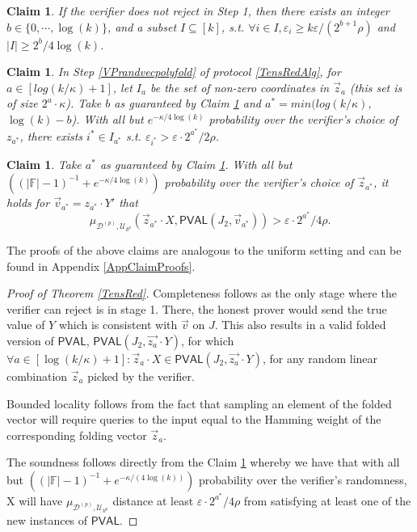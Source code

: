 \documentclass[11pt]{article}
\newtheorem{claim}[theorem]{Claim}
\newcommand{\PVAL}{\mathsf{PVAL}}
\newcommand{\F}{\mathbb{F}}
\begin{document}
\begin{claim}\label{sumEps}
If the verifier does not reject in Step 1, then there exists an integer $b \in \{0,\cdots, \log (k)\}$, and a subset $I \subseteq [k]$, s.t. $\forall i \in I, \varepsilon_{i} \geq k\varepsilon/(2^{b+1}\rho)$ and $\vert I\vert  \geq 2^{b}/4\log (k)$.
\end{claim}

\begin{claim}\label{ISize}
In Step \ref{VPrandvecpolyfold} of protocol \ref{TensRedAlg}, for $a \in [log(k/\kappa) + 1]$, let $I_{a}$ be the set of non-zero coordinates in $\vec{z}_{a}$ (this set is of size $2^{a}\cdot \kappa$). Take $b$ as guaranteed by Claim \ref{sumEps} and $a^{\ast} = min(log(k/\kappa)$, $\log (k) - b$). With all but $e^{-\kappa/4 \log (k)}$ probability over the verifier’s choice of $z_{a^{\ast}}$, there exists $i^{\ast} \in I_{a^{\ast}}$ s.t. $\varepsilon_{i^{\ast}} > \varepsilon \cdot 2^{a^{\ast}}/2\rho$.
\end{claim}

\begin{claim}\label{TensRedSound}
Take $a^{\ast}$ as guaranteed by Claim \ref{ISize}. With all but $((\vert \F\vert -1)^{-1}+e^{-\kappa/4 \log (k)} )$ probability over the verifier’s choice of $\vec{z}_{a^{\ast}}$, it holds for $\vec{v}_{a^{\ast}}=z_{a^{\ast}}\cdot Y'$ that 
\begin{equation*}
    \mu_{\mathcal{D}^{(p)},\mathcal{U}_{k^{p}}}(\vec{z}_{a^{\ast}}\cdot X,\PVAL(J_{2},\vec{v}_{a^{\ast}}))> \varepsilon\cdot2^{a^{\ast}}/4\rho.
\end{equation*}
\end{claim}

The proofs of the above claims are analogous to the uniform setting and can be found in Appendix \ref{AppClaimProofs}.

\begin{proof}[Proof of Theorem \ref{TensRed}]
Completeness follows as the only stage where the verifier can reject is in stage 1. There, the honest prover would send the true value of $Y$ which is consistent with $\vec{v}$ on $J$. This also results in a valid folded version of $\PVAL$, $\PVAL(J_{2}, \Vec{z_{a}}\cdot Y)$, for which $\forall a\in [\log(k/\kappa)+1]: \vec{z}_{a}\cdot X\in \PVAL(J_{2}, \Vec{z_{a}}\cdot Y)$, for any random linear combination $\Vec{z}_{a}$ picked by the verifier.   

Bounded locality follows from the fact that sampling an element of the folded vector will require queries to the input equal to the Hamming weight of the corresponding folding vector $\vec{z}_{a}$.    

The soundness follows directly from the Claim \ref{TensRedSound} whereby we have that with all but $((\vert \F\vert -1)^{-1} + e^{-\kappa/(4 \log (k))})$ probability over the verifier's randomness,  X will have $\mu_{\mathcal{D}^{(p)},\mathcal{U}_{k^{p}}}$ distance at least $\varepsilon\cdot2^{a^{\ast}}/4\rho$ from satisfying at least one of the new instances of $\PVAL$.
\end{proof}
\end{document}
